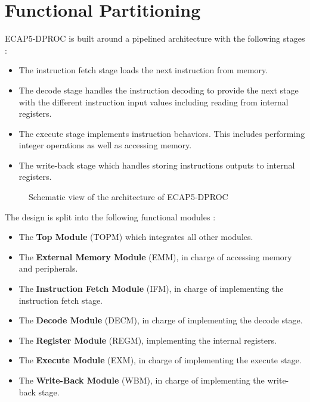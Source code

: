 \section{Functional Partitioning}

\begin{content}
  ECAP5-DPROC is built around a pipelined architecture with the following stages :
  \begin{itemize}
    \vspace{-0.5em}
    \item The instruction fetch stage loads the next instruction from memory.
    \vspace{-0.5em}
    \item The decode stage handles the instruction decoding to provide the next stage with the different instruction input values including reading from internal registers.
    \vspace{-0.5em}
    \item The execute stage implements instruction behaviors. This includes performing integer operations as well as accessing memory.
    \vspace{-0.5em}
    \item The write-back stage which handles storing instructions outputs to internal registers.
  \end{itemize}

\begin{figure}[h!]
    \centering
    
    \caption{Schematic view of the architecture of ECAP5-DPROC}
    \label{fig:architecture}
\end{figure}

  The design is split into the following functional modules :
  \begin{itemize}
    \vspace{-0.5em}
    \item The \textbf{Top Module} (TOPM) which integrates all other modules.
    \item The \textbf{External Memory Module} (EMM), in charge of accessing memory and peripherals.
    \vspace{-0.5em}
    \item The \textbf{Instruction Fetch Module} (IFM), in charge of implementing the instruction fetch stage.
    \vspace{-0.5em}
    \item The \textbf{Decode Module} (DECM), in charge of implementing the decode stage.
    \vspace{-0.5em}
    \item The \textbf{Register Module} (REGM), implementing the internal registers.
    \vspace{-0.5em}
    \item The \textbf{Execute Module} (EXM), in charge of implementing the execute stage.
    \item The \textbf{Write-Back Module} (WBM), in charge of implementing the write-back stage.
  \end{itemize}
\end{content}

